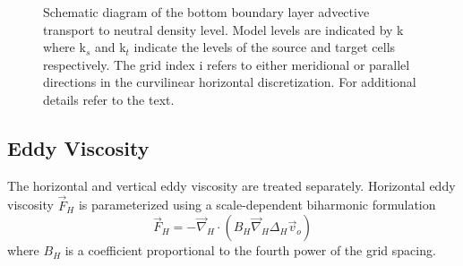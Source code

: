 \begin{figure}[!tb]%
\centerline{\hbox{}}
\caption{Schematic diagram of the bottom boundary layer advective transport to neutral density level.
Model levels are indicated by k where
k$_s$ and k$_t$ indicate the levels of the source and target cells respectively.
The grid index i refers to either meridional or parallel directions in the curvilinear 
horizontal discretization.
For additional details refer to the text.
}
\label{fig:bbl}
\end{figure}

\subsection{Eddy Viscosity}


The horizontal and vertical eddy viscosity are treated separately.
Horizontal eddy viscosity ${\vec F}_H$ is parameterized 
using a scale-dependent biharmonic formulation
\begin{equation}
\label{eqn:momvisc}
{\vec F}_H =
- {\vec \nabla_{H}} \cdot \left( B_H {\vec\nabla_H} \Delta_H {\vec v_o} \right)
\end{equation}
where $B_H$ is a coefficient proportional to the fourth power
of the grid spacing.
 
